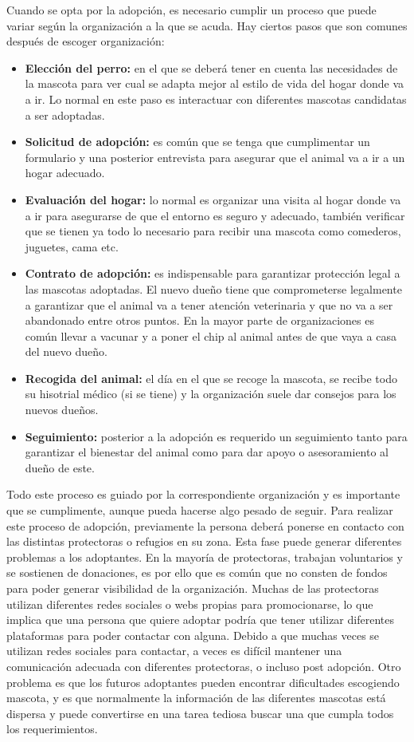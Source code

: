 \documentclass[a4paper, 12pt]{article}
\begin{document}
Cuando se opta por la adopción, es necesario cumplir un proceso que puede variar según la organización a la que se acuda. Hay ciertos pasos que son comunes después de escoger organización:
\begin{itemize}
\item \textbf{Elección del perro:} en el que se deberá tener en cuenta las necesidades de la mascota para ver cual se adapta mejor al estilo de vida del hogar donde va a ir. Lo normal en este paso es interactuar con diferentes mascotas candidatas a ser adoptadas.
\item\textbf{Solicitud de adopción:} es común que se tenga que cumplimentar un formulario y una posterior entrevista para asegurar que el animal va a ir a un hogar adecuado.
\item \textbf{Evaluación del hogar:} lo normal es organizar una visita al hogar donde va a ir para asegurarse de que el entorno es seguro y adecuado, también verificar que se tienen ya todo lo necesario para recibir una mascota como comederos, juguetes, cama etc.
\item \textbf{Contrato de adopción:} es indispensable para garantizar protección legal a las mascotas adoptadas. El nuevo dueño tiene que comprometerse legalmente a garantizar que el animal va a tener atención veterinaria y que no va a ser abandonado entre otros puntos. En la mayor parte de organizaciones es común llevar a vacunar y a poner el chip al animal antes de que vaya a casa del nuevo dueño.
\item \textbf{Recogida del animal:} el día en el que se recoge la mascota, se recibe todo su hisotrial médico (si se tiene) y la organización suele dar consejos para los nuevos dueños.
\item \textbf{Seguimiento:} posterior a la adopción es requerido un seguimiento tanto para garantizar el bienestar del animal como para dar apoyo o asesoramiento al dueño de este.
\end{itemize}

Todo este proceso es guiado por la correspondiente organización y es importante que se cumplimente, aunque pueda hacerse algo pesado de seguir. Para realizar este proceso de adopción, previamente la persona deberá ponerse en contacto con las distintas protectoras o refugios en su zona. Esta fase puede generar diferentes problemas a los adoptantes. En la mayoría de protectoras, trabajan voluntarios y se sostienen de donaciones, es por ello que es común que no consten de fondos para poder generar visibilidad de la organización. Muchas de las protectoras utilizan diferentes redes sociales o webs propias para promocionarse, lo que implica que una persona que quiere adoptar podría que tener utilizar diferentes plataformas para poder contactar con alguna. Debido a que muchas veces se utilizan redes sociales para contactar, a veces es difícil mantener una comunicación adecuada con diferentes protectoras, o incluso post adopción. Otro problema es que los futuros adoptantes pueden encontrar dificultades escogiendo mascota, y es que normalmente la información de las diferentes mascotas está dispersa y puede convertirse en una tarea tediosa buscar una que cumpla todos los requerimientos. 
\end{document}
